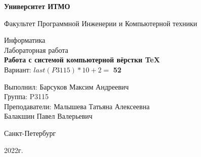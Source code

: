 \thispagestyle{empty}
\begin{center}
    \textbf{Университет ИТМО}

    \vspace{1em}
    Факультет Программной Инженерии и Компьютерной техники

    \vspace{20em}
    
    {\Large Информатика}\\[1em]
    {\Large Лабораторная работа }\\[1em]
    {\Large \textbf{Работа с системой компьютерной вёрстки \TeX}}\\[1em]
    Вариант: $last(P3115) * 10 + 2 =$ \textbf{52}
\end{center}

\vspace{12em}

\begin{flushright}
    Выполнил:
    Барсуков Максим Андреевич\\
    Группа: P3115\\
    Преподаватели:
    Малышева Татьяна Алексеевна\\
    Балакшин Павел Валерьевич \\
\end{flushright}
\vspace{8em}
\vspace{\fill}

\begin{center}
Санкт-Петербург

2022г.
\end{center}
